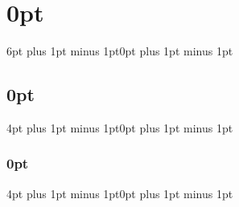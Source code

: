 \titlespacing\section{0pt}{6pt plus 1pt minus 1pt}{0pt plus 1pt minus 1pt}
\titlespacing\subsection{0pt}{4pt plus 1pt minus 1pt}{0pt plus 1pt minus 1pt}
\titlespacing\subsubsection{0pt}{4pt plus 1pt minus 1pt}{0pt plus 1pt minus 1pt}

\usepackage{epigraph} %
\renewcommand{\textflush}{flushright} %

\usepackage{amsthm, amsmath, amssymb} %
\usepackage{mathrsfs} %
\usepackage{float} %
\usepackage[final, colorlinks = true, 
            linkcolor = black, 
            citecolor = black,
            breaklinks=true]{hyperref} %
\usepackage{graphicx, multicol} %
\usepackage{xcolor} %
\usepackage{framed}
\usepackage[normalem]{ulem} %
\usepackage{amsfonts}
\usepackage{enumitem}
\usepackage{mathtools}
\usepackage{multicol}
\usepackage{color,soul}

\usepackage[toc, title]{appendix} %

\usepackage[labelfont=bf]{caption} %

\usepackage{makecell,tabularx}
\renewcommand{\arraystretch}{2} %
\renewcommand\theadfont{\small\bfseries}
\usepackage{rotating}
\usepackage{setspace}

\usepackage[boxed]{algorithm2e}
\DontPrintSemicolon

\newtheorem{theorem}{Theorem}[section]
\newtheorem{corollary}{Corollary}[section]
\theoremstyle{definition}
\newtheorem*{definition}{Definition}
\newtheorem{example}{Example}
\newtheorem*{note}{Note}
\newtheorem*{claim}{Claim}
\newcommand{\bproof}{\bigskip {\bf Proof. }}
\newcommand{\eproof}{\hfill\qedsymbol}
\newcommand{\Disp}{\displaystyle}
\newcommand{\qe}{\hfill\(\bigtriangledown\)}
\setlength{\columnseprule}{1 pt}

